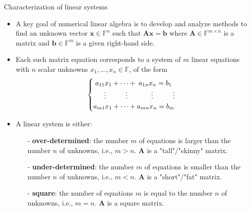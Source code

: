 \documentclass[t,usepdftitle=false]{beamer}
\begin{document}
\begin{frame}{Characterization of linear systems}
\begin{itemize}
\item A key goal of numerical linear algebra is to develop and analyze methods to find an unknown vector $\mathbf{x}\in\mathbb{F}^n$ such that $\mathbf{A}\mathbf{x}=\mathbf{b}$ where $\mathbf{A}\in\mathbb{F}^{m\times n}$ is a matrix and $\mathbf{b}\in\mathbb{F}^m$ is a given right-hand side.
\item Each such matrix equation corresponds to a system of $m$ linear equations with $n$ scalar unknowns $x_1,\dots,x_n\in\mathbb{F}$, of the form 
\begin{align*}
\begin{cases}
\;a_{11}x_1+\dots+\;a_{1n}x_n=b_1\\
\hspace{.55cm}\vdots\hspace{1cm}\vdots\hspace{1.2cm}\vdots\hspace{1cm}\vdots\\
a_{m1}x_1+\dots+a_{mn}x_n=b_m
\end{cases}
\end{align*}
\item A linear system is either:
\begin{itemize}
\item[-] \textbf{over-determined}: the number $m$ of equations is larger than the number $n$ of unknowns, i.e., $m>n$. 
$\mathbf{A}$ is a "tall"/"skinny" matrix.
\item[-] \textbf{under-determined}: the number $m$ of equations is smaller than the number $n$ of unknowns, i.e., $m<n$.
$\mathbf{A}$ is a "short"/"fat" matrix.
\item[-] \textbf{square}: the number of equations $m$ is equal to the number $n$ of unknowns, i.e., $m=n$.
$\mathbf{A}$ is a square matrix.
\end{itemize}
\end{itemize}
\end{frame}
\end{document}
